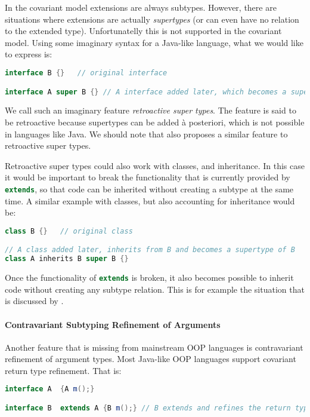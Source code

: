 In the covariant model extensions are always subtypes. However, 
there are situations where extensions are actually
\emph{supertypes} (or can even have no relation to the extended type). Unfortunatelly this is not supported in the
covariant model. Using some imaginary syntax for a Java-like language, 
what we would like to express is:

\begin{lstlisting}[language=java]
interface B {}   // original interface

interface A super B {} // A interface added later, which becomes a supertype of B
\end{lstlisting}

\noindent We call such an imaginary feature \emph{retroactive super types}. The
feature is said to be retroactive because supertypes can be added \`a
posteriori, which is not possible in languages like Java. We should note that
\citet{ostermann2008nominal} also proposes a similar feature to retroactive
super types.

Retroactive super types could also work with classes, and
inheritance. In this case it would be important to break the
functionality that is currently provided by \lstinline[language=java]{extends}, so that
code can be inherited without creating a subtype at the same time. 
A similar example with classes, but also accounting for inheritance 
would be:

\begin{lstlisting}[language=java]
class B {}   // original class

// A class added later, inherits from B and becomes a supertype of B
class A inherits B super B {}
\end{lstlisting}

\noindent Once the functionality of \lstinline[language=java]{extends} is broken, it also
becomes possible to inherit code without creating any subtype
relation. This is for example the situation that is discussed by \citet{cook1989inheritance}.

\paragraph{Contravariant Subtyping Refinement of Arguments}
Another feature that is missing from mainstream OOP languages is 
contravariant refinement of argument types. Most Java-like OOP languages support covariant return type 
refinement. That is:

\begin{lstlisting}[language=java]
interface A  {A m();} 

interface B  extends A {B m();} // B extends and refines the return type of m() to a subtype
\end{lstlisting}

